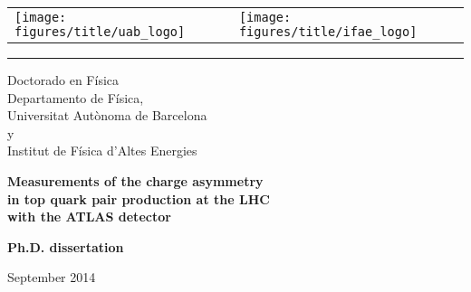 \linespread{1.5}
\begin{center}
\par
\vspace{6pt}
\begin{tabular}{p{5cm}p{5cm}}
\texttt{[image: figures/title/uab\_logo]}&
\texttt{[image: figures/title/ifae\_logo]}\\
\end{tabular}
\par
\vspace{6pt}
\hrule 
\par
\vspace{6pt}
\par
\begin{Large}
Doctorado en F\'isica\\
\vspace{-5pt}
Departamento de F\'isica,\\
\vspace{-10pt}
Universitat Aut\`onoma de Barcelona\\
\vspace{-10pt}
y\\
\vspace{-10pt}
Institut de F\'isica d'Altes Energies\\
\end{Large}
\vspace{80pt}
{\huge \bfseries Measurements of the charge asymmetry } \\
\vspace{6pt}
{\huge \bfseries in top quark pair production at the LHC } \\
\vspace{6pt}
{\huge \bfseries  with the ATLAS detector }
\vspace{40pt} \\

\begin{large}
\textbf{Ph.D. dissertation}
\par
\vspace{2pt}
\par
September 2014 \\ 
\par
\vspace{48pt}
\par
\end{large} 


\end{center}

